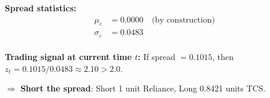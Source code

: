 \documentclass[12pt, a4paper]{article}
\begin{document}
\textbf{Spread statistics:}
\begin{align*}
    \mu_\varepsilon &= 0.0000 \quad \text{(by construction)} \\
    \sigma_\varepsilon &= 0.0483 \\
\end{align*}

\textbf{Trading signal at current time $t$:}
If spread $= 0.1015$, then $z_t = 0.1015 / 0.0483 \approx 2.10 > 2.0$.

$\Rightarrow$ \textbf{Short the spread}: Short 1 unit Reliance, Long 0.8421 units TCS.
\end{document}
